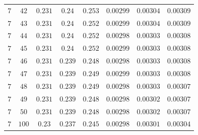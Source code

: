 \begin{table}[H]
\begin{tabular}{cccccccc}
$7$ & $42$ & $0.231$ & $0.24$ & $0.253$ & $0.00299$ & $0.00304$ & $0.00309$\\
$7$ & $43$ & $0.231$ & $0.24$ & $0.252$ & $0.00299$ & $0.00304$ & $0.00309$\\
$7$ & $44$ & $0.231$ & $0.24$ & $0.252$ & $0.00298$ & $0.00303$ & $0.00308$\\
$7$ & $45$ & $0.231$ & $0.24$ & $0.252$ & $0.00299$ & $0.00303$ & $0.00308$\\
$7$ & $46$ & $0.231$ & $0.239$ & $0.248$ & $0.00298$ & $0.00303$ & $0.00308$\\
$7$ & $47$ & $0.231$ & $0.239$ & $0.249$ & $0.00299$ & $0.00303$ & $0.00308$\\
$7$ & $48$ & $0.231$ & $0.239$ & $0.249$ & $0.00298$ & $0.00303$ & $0.00307$\\
$7$ & $49$ & $0.231$ & $0.239$ & $0.248$ & $0.00298$ & $0.00302$ & $0.00307$\\
$7$ & $50$ & $0.231$ & $0.239$ & $0.248$ & $0.00298$ & $0.00302$ & $0.00307$\\
$7$ & $100$ & $0.23$ & $0.237$ & $0.245$ & $0.00298$ & $0.00301$ & $0.00304$\\
\end{tabular}
\end{table}
 